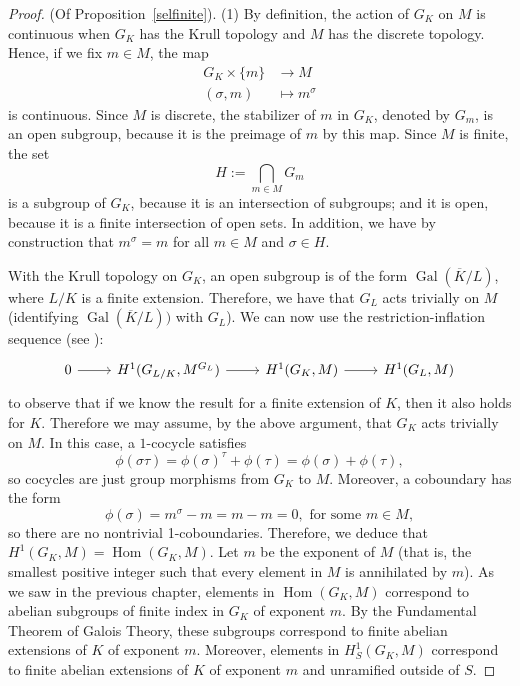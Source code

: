 \documentclass[a4paper, 12pt]{amsart}
\theoremstyle{definition}
\theoremstyle{plain}
\theoremstyle{plain}
\theoremstyle{plain}
\theoremstyle{plain}
\theoremstyle{remark}
\theoremstyle{remark}
\theoremstyle{plain}
\newcommand{\propref}[1]{Proposition~\ref{#1}}
\DeclareMathOperator{\Gal}{Gal}
\DeclareMathOperator{\Hom}{Hom}
\begin{document}
	\begin{proof} (Of \propref{selfinite}). (1) By definition, the action of $G_K$ on $M$ is continuous when $G_K$ has the Krull topology and $M$ has the discrete topology. Hence, if we fix $m\in M$, the map
			\begin{align*}
				G_K\times \{m\}&\rightarrow M\\
				(\sigma,m)&\mapsto m^\sigma
			\end{align*}
			is continuous. Since $M$ is discrete, the stabilizer of $m$ in $G_K$, denoted by $G_m$, is an open subgroup, because it is the preimage of $m$ by this map. Since $M$ is finite, the set
			\begin{equation*}
				H:=\bigcap_{m\in M}G_m
			\end{equation*}
			is a subgroup of $G_K$, because it is an intersection of subgroups; and it is open, because it is a finite intersection of open sets. In addition, we have by construction that $m^\sigma=m$ for all $m\in M$ and $\sigma\in H$. 
			
			With the Krull topology on $G_K$, an open subgroup is of the form $\Gal(\overline{K}/L)$, where $L/K$ is a finite extension. Therefore, we have that $G_L$ acts trivially on $M$ (identifying $\Gal(\overline{K}/L))$ with $G_L$). We can now use the restriction-inflation sequence (see \cite{Serre_1979}):
			\begin{equation*}
				\begin{tikzcd}
					0\arrow{r}
					& H^1(G_{L/K},M^{G_L})\arrow{r}
					& H^1(G_K,M)\arrow{r}
					& H^1(G_L,M)
				\end{tikzcd}
			\end{equation*}
			to observe that if we know the result for a finite extension of $K$, then it also holds for $K$. Therefore we may assume, by the above argument, that $G_K$ acts trivially on $M$. In this case, a $1$-cocycle satisfies
			\begin{equation*}
				\phi(\sigma\tau)=\phi(\sigma)^\tau+\phi(\tau)=\phi(\sigma)+\phi(\tau),
			\end{equation*}
			so cocycles are just group morphisms from $G_K$ to $M$. Moreover, a coboundary has the form
			\begin{equation*}
				\phi(\sigma)=m^\sigma-m=m-m=0,\text{ for some } m\in M,
			\end{equation*}
			so there are no nontrivial 1-coboundaries. Therefore, we deduce that $H^1(G_K,M)=\Hom(G_K,M)$. Let $m$ be the exponent of $M$ (that is, the smallest positive integer such that every element in $M$ is annihilated by $m$). As we saw in the previous chapter, elements in $\Hom(G_K,M)$ correspond to abelian subgroups of finite index in $G_K$ of exponent $m$. By the Fundamental Theorem of Galois Theory, these subgroups correspond to finite abelian extensions of $K$ of exponent $m$. Moreover, elements in $H^1_S(G_K,M)$ correspond to finite abelian extensions of $K$ of exponent $m$ and unramified outside of $S$.
			

\end{proof}
\end{document}
